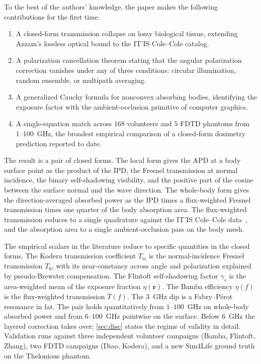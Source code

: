 \documentclass[journal,twocolumn,10pt]{IEEEtran}
\theoremstyle{plain}
\theoremstyle{remark}
\newcommand{\rr}{\mathbf{r}}
\newcommand{\Tbar}{\bar{T}}
\begin{document}
To the best of the authors' knowledge, the paper makes the following
contributions for the first time.
\begin{enumerate}
  \item A closed-form transmission collapse on lossy biological
  tissue, extending Azzam's lossless optical bound to the IT'IS
  Cole--Cole catalog.
  \item A polarization cancellation theorem stating that the angular
  polarization correction vanishes under any of three conditions:
  circular illumination, random ensemble, or multipath averaging.
  \item A generalized Cauchy formula for nonconvex absorbing bodies,
  identifying the exposure factor with the ambient-occlusion
  primitive of computer graphics.
  \item A single-equation match across $168$ volunteers and $5$ FDTD
  phantoms from 1--100~GHz, the broadest empirical comparison
  of a closed-form dosimetry prediction reported to date.
\end{enumerate}

The result is a pair of closed forms. The local form gives the
\gls{APD} at a body surface point as the product of the
\gls{IPD}, the Fresnel transmission at normal incidence,
the binary self-shadowing visibility, and the positive part of the
cosine between the surface normal and the wave direction. The
whole-body form gives the direction-averaged absorbed power as the
\gls{IPD} times a flux-weighted Fresnel transmission
times one quarter of the body absorption area. The flux-weighted
transmission reduces to a single quadrature against the IT'IS
Cole--Cole data~\cite{ITISv5,Gabriel1996}, and the absorption area
to a single ambient-occlusion pass on the body mesh.

The empirical scalars in the literature reduce to specific
quantities in the closed forms. The Kodera transmission coefficient
$T_{\mathrm{tr}}$ is the normal-incidence Fresnel transmission $T_0$,
with its near-constancy across angle and polarization explained by
pseudo-Brewster compensation. The Flintoft self-shadowing factor
$\gamma_s$ is the area-weighted mean of the exposure fraction
$\eta(\rr)$. The Bamba efficiency $\eta(f)$ is the flux-weighted
transmission $\Tbar(f)$. The $3$~GHz dip is a Fabry--P\'erot
resonance in fat. The pair holds quantitatively from $1$--$100$~GHz
on whole-body absorbed power and from $6$--$100$~GHz pointwise on
the surface. Below $6$~GHz the layered correction takes over;
\cref{sec:disc} states the regime of validity in detail.
Validation runs against three independent volunteer campaigns
(Bamba, Flintoft, Zhang), two FDTD campaigns (Diao, Kodera), and a
new Sim4Life ground truth on the Thelonious phantom.
\end{document}
